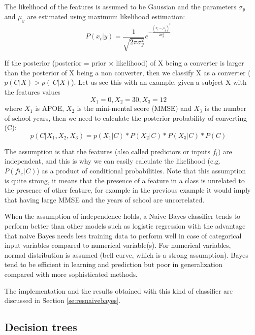 \documentclass[11pt]{article}
\theoremstyle{definition}
\theoremstyle{remark}
\begin{document}
The likelihood of the features is assumed to be Gaussian and the parameters $\sigma_y$ and $\mu_y$ are estimated using maximum likelihood estimation:
\begin{equation} 
P(x_i|y)= \frac{1}{\sqrt{2\pi\sigma_y^{2}}}e^{-\frac{(x_i-\mu_y)^2}{2\sigma_y^2}}
\label{eq:naiveb}
\end{equation}

If the posterior (posterior = prior $\times$ likelihood) of X being a converter is larger than the posterior of X being a non converter, then we classify X as a converter ($p(C|X) > p(~C|X)$). Let us see this with an example, given a subject X with the features values 
\begin{equation*}
X_1 = 0, X_2=30, X_3=12
\end{equation*}
where $X_1$ is APOE, $X_2$ is the mini-mental score (MMSE) and $X_3$ is the number of school years, then we need to calculate the 
posterior probability of converting (C):
\begin{equation*}
p(C|X_1,X_2,X_3) = p(X_1|C) * P(X_2|C) * P(X_3|C) * P(C)
\end{equation*}

The assumption is that the features (also called predictors or inputs $f_i$) are independent, and this is why we can easily calculate the likelihood (e.g. $P(fi_x|C)$) as a product of conditional probabilities. Note that this assumption is quite strong, it means that the presence of a feature in a class is unrelated to the presence of other feature, for example in the previous example it would imply that having large MMSE and the years of school are uncorrelated.

When the assumption of independence holds, a Naive Bayes classifier tends to perform better than other models such as logistic regression with the advantage that naive Bayes needs less training data to perform well in case of categorical input variables compared to numerical variable(s). For numerical variables, normal distribution is assumed (bell curve, which is a strong assumption).
Bayes tend to be efficient in learning and prediction but poor in generalization compared with more sophisticated methods.

The implementation and the results obtained with this kind of classifier are discussed in Section \ref{se:resnaivebayes}.

\subsection{Decision trees}
\label{sse:dectrees}
\end{document}
